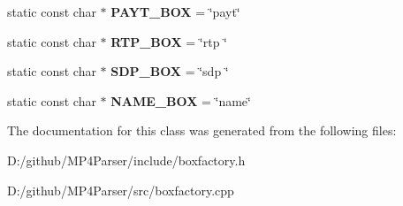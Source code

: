 \begin{DoxyCompactItemize}
\item 
\mbox{\label{classmp4_parser_1_1_box_factory_aee7341f67098b88294c3e9aeb530c22c}} 
static const char $\ast$ {\bfseries P\+A\+Y\+T\+\_\+\+B\+OX} = \char`\"{}payt\char`\"{}
\item 
\mbox{\label{classmp4_parser_1_1_box_factory_a5f5b9785454e662a1e95c33987cc2ae7}} 
static const char $\ast$ {\bfseries R\+T\+P\+\_\+\+B\+OX} = \char`\"{}rtp \char`\"{}
\item 
\mbox{\label{classmp4_parser_1_1_box_factory_a791099dace5a8b1901c45aa8a4138c63}} 
static const char $\ast$ {\bfseries S\+D\+P\+\_\+\+B\+OX} = \char`\"{}sdp \char`\"{}
\item 
\mbox{\label{classmp4_parser_1_1_box_factory_a6d8ed92b88191f0fda042e109fa157fb}} 
static const char $\ast$ {\bfseries N\+A\+M\+E\+\_\+\+B\+OX} = \char`\"{}name\char`\"{}
\end{DoxyCompactItemize}


The documentation for this class was generated from the following files\+:\begin{DoxyCompactItemize}
\item 
D\+:/github/\+M\+P4\+Parser/include/boxfactory.\+h\item 
D\+:/github/\+M\+P4\+Parser/src/boxfactory.\+cpp\end{DoxyCompactItemize}
